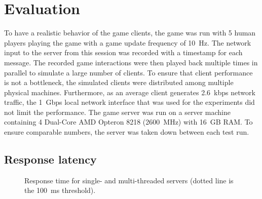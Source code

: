 \section{Evaluation}\label{sec:eval}

  
To have a realistic behavior of the game clients, the game was run
with 5 human players playing the game with a game update frequency of
10~Hz. The network input to the server from this session was recorded
with a timestamp for each message. The recorded game interactions were
then played back multiple times in parallel to simulate a large number
of clients. To ensure that client performance is not a bottleneck, the
simulated clients were distributed among multiple physical
machines. Furthermore, as an average client generates 2.6~kbps network
traffic, the 1~Gbps local network interface that was used for the
experiments did not limit the performance. The game server was run on a
server machine containing 4 Dual-Core AMD Opteron 8218 (2600~MHz) with
16~GB RAM. To ensure comparable numbers, the server was taken down
between each test run.

\subsection{Response latency}
%
%

\begin{figure*}[!t!] 
  \centering
  \vspace{-3mm}
  \caption{Response time for single- and multi-threaded servers
 (dotted line is the 100~ms threshold). }
  \label{fig:boxPlots}
\end{figure*}

